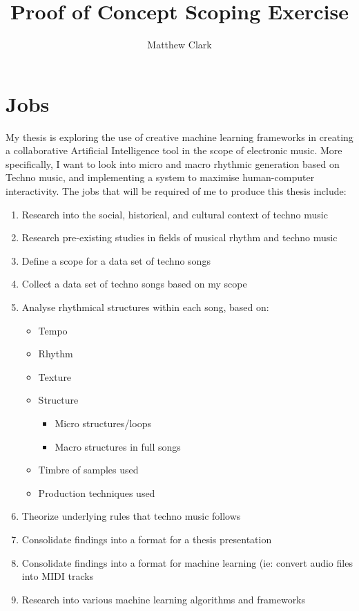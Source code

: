 \documentclass{article}
\title{Proof of Concept Scoping Exercise}
\author{Matthew Clark}
\date{}
\begin{document}
\maketitle
\newpage

\section{Jobs}
My thesis is exploring the use of creative machine learning frameworks in creating a collaborative Artificial Intelligence tool in the scope of electronic music. More specifically, I want to look into micro and macro rhythmic generation based on Techno music, and implementing a system to maximise human-computer interactivity. The jobs that will be required of me to produce this thesis include:
\begin{enumerate}
    \item Research into the social, historical, and cultural context of techno music
    \item Research pre-existing studies in fields of musical rhythm and techno music
    \item Define a scope for a data set of techno songs
    \item Collect a data set of techno songs based on my scope
    \item Analyse rhythmical structures within each song, based on:
    \begin{itemize}
        \item Tempo
        \item Rhythm
        \item Texture
        \item Structure
        \begin{itemize}
            \item Micro structures/loops
            \item Macro structures in full songs
        \end{itemize}
        \item Timbre of samples used
        \item Production techniques used
    \end{itemize}
    \item Theorize underlying rules that techno music follows
    \item Consolidate findings into a format for a thesis presentation
    \item Consolidate findings into a format for machine learning (ie: convert audio files into MIDI tracks
    \item Research into various machine learning algorithms and frameworks

\end{enumerate}
\end{document}

